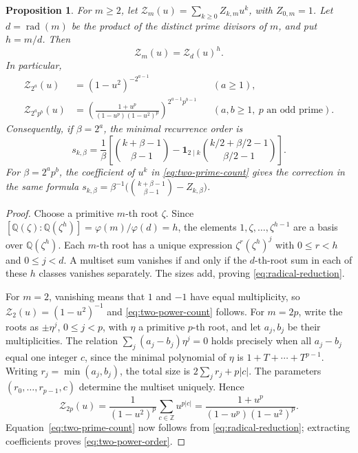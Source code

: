 \documentclass[11pt]{amsart}
\newtheorem{proposition}[thm]{Proposition}
\theoremstyle{definition}
\newcommand{\Z}{\mathbb Z}
\newcommand{\Q}{\mathbb Q}
\begin{document}
\begin{proposition}\label{prop:zero-sum-series}
For $m\ge2$, let
$\mathcal Z_m(u)=\sum_{k\ge0}Z_{k,m}u^k$, with $Z_{0,m}=1$.
Let $d=\operatorname{rad}(m)$ be the product of the distinct prime divisors
of $m$, and put $h=m/d$.  Then
\begin{equation}\label{eq:radical-reduction}
 \mathcal Z_m(u)=\mathcal Z_d(u)^h.
\end{equation}
In particular,
\begin{align}
 \mathcal Z_{2^a}(u)&=(1-u^2)^{-2^{a-1}} &&(a\ge1),\label{eq:two-power-count}\\
 \mathcal Z_{2^a p^b}(u)
 &=\left(\frac{1+u^p}{(1-u^p)(1-u^2)^p}\right)^{2^{a-1}p^{b-1}}
 &&(a,b\ge1,\ p\text{ an odd prime}).\label{eq:two-prime-count}
\end{align}
Consequently, if $\beta=2^a$, the minimal recurrence order is
\begin{equation}\label{eq:two-power-order}
 s_{k,\beta}=\frac1\beta\left[
  \binom{k+\beta-1}{\beta-1}
  -\mathbf1_{2\mid k}\binom{k/2+\beta/2-1}{\beta/2-1}
 \right].
\end{equation}
For $\beta=2^a p^b$, the coefficient of $u^k$ in
\eqref{eq:two-prime-count} gives the correction in the same formula
$s_{k,\beta}=\beta^{-1}\bigl(\binom{k+\beta-1}{\beta-1}-Z_{k,\beta}\bigr)$.
\end{proposition}

\begin{proof}
Choose a primitive $m$-th root $\zeta$.  Since
$[\Q(\zeta):\Q(\zeta^h)]=\varphi(m)/\varphi(d)=h$, the elements
$1,\zeta,\ldots,\zeta^{h-1}$ are a basis over $\Q(\zeta^h)$.
Each $m$-th root has a unique expression
$\zeta^r(\zeta^h)^j$ with $0\le r<h$ and $0\le j<d$.
A multiset sum vanishes if and only if the $d$-th-root sum in each of
these $h$ classes vanishes separately.  The sizes add, proving
\eqref{eq:radical-reduction}.

For $m=2$, vanishing means that $1$ and $-1$ have equal multiplicity,
so $\mathcal Z_2(u)=(1-u^2)^{-1}$ and
\eqref{eq:two-power-count} follows.
For $m=2p$, write the roots as $\pm\eta^j$, $0\le j<p$, with $\eta$
a primitive $p$-th root, and let $a_j,b_j$ be their multiplicities.
The relation $\sum_j(a_j-b_j)\eta^j=0$ holds precisely when all
$a_j-b_j$ equal one integer $c$, since the minimal polynomial of $\eta$
is $1+T+\cdots+T^{p-1}$.
Writing $r_j=\min(a_j,b_j)$, the total size is
$2\sum_jr_j+p|c|$.  The parameters $(r_0,\ldots,r_{p-1},c)$ determine
the multiset uniquely.  Hence
\[
 \mathcal Z_{2p}(u)
 =\frac1{(1-u^2)^p}\sum_{c\in\Z}u^{p|c|}
 =\frac{1+u^p}{(1-u^p)(1-u^2)^p}.
\]
Equation~\eqref{eq:two-prime-count} now follows from
\eqref{eq:radical-reduction}; extracting coefficients proves
\eqref{eq:two-power-order}.
\end{proof}
\end{document}
